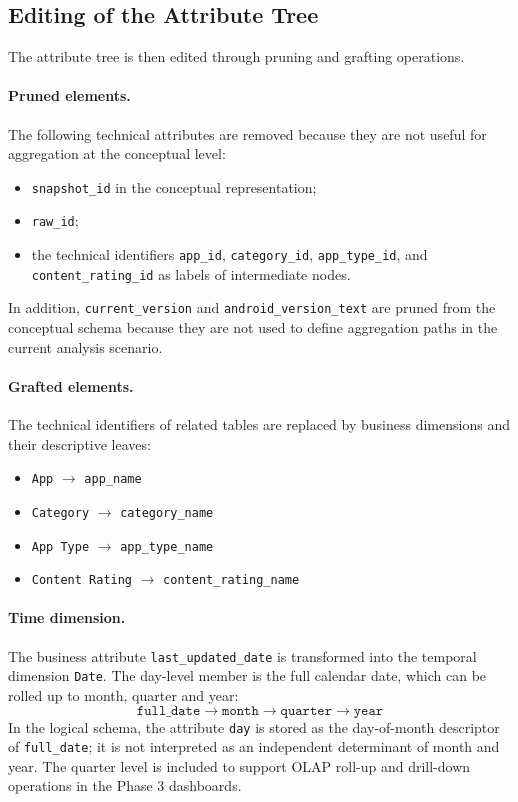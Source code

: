 \documentclass[11pt,a4paper]{article}
\begin{document}
\subsection{Editing of the Attribute Tree}
The attribute tree is then edited through pruning and grafting operations.

\paragraph{Pruned elements.}
The following technical attributes are removed because they are not useful for aggregation at the conceptual level:
\begin{itemize}[leftmargin=1.5em]
    \item \texttt{snapshot\_id} in the conceptual representation;
    \item \texttt{raw\_id};
    \item the technical identifiers \texttt{app\_id}, \texttt{category\_id}, \texttt{app\_type\_id}, and \texttt{content\_rating\_id} as labels of intermediate nodes.
\end{itemize}

In addition, \texttt{current\_version} and \texttt{android\_version\_text} are pruned from the conceptual schema because they are not used to define aggregation paths in the current analysis scenario.

\paragraph{Grafted elements.}
The technical identifiers of related tables are replaced by business dimensions and their descriptive leaves:
\begin{itemize}[leftmargin=1.5em]
    \item \texttt{App} $\rightarrow$ \texttt{app\_name}
    \item \texttt{Category} $\rightarrow$ \texttt{category\_name}
    \item \texttt{App Type} $\rightarrow$ \texttt{app\_type\_name}
    \item \texttt{Content Rating} $\rightarrow$ \texttt{content\_rating\_name}
\end{itemize}

\paragraph{Time dimension.}
The business attribute \texttt{last\_updated\_date} is transformed into the temporal dimension \texttt{Date}. The day-level member is the full calendar date, which can be rolled up to month, quarter and year:
\[
\texttt{full\_date} \rightarrow \texttt{month} \rightarrow \texttt{quarter} \rightarrow \texttt{year}
\]
In the logical schema, the attribute \texttt{day} is stored as the day-of-month descriptor of \texttt{full\_date}; it is not interpreted as an independent determinant of month and year. The quarter level is included to support OLAP roll-up and drill-down operations in the Phase 3 dashboards.
\end{document}
